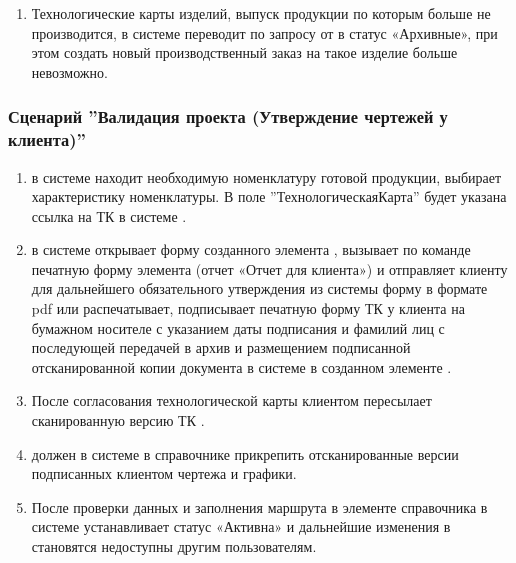 \begin{enumerate}
\item	Технологические карты изделий, выпуск продукции по которым больше не производится,  \tehnolog в системе \gofro переводит по запросу от \manager в статус «Архивные», при этом создать новый производственный заказ на такое изделие больше невозможно.

\end{enumerate}





\subsubsection{Сценарий ''Валидация проекта (Утверждение чертежей у клиента)''}
\label{bp:pm_2}

\begin{enumerate}
\item \manager в системе \erp находит необходимую номенклатуру готовой продукции, выбирает характеристику номенклатуры. В поле ''ТехнологическаяКарта'' будет указана ссылка на ТК в системе \gofro.
\item \manager  в системе  \gofro открывает форму созданного элемента , вызывает по команде  печатную форму элемента  (отчет «Отчет для клиента») и отправляет клиенту для дальнейшего обязательного утверждения из системы \gofro форму в формате pdf или распечатывает, подписывает печатную форму ТК у клиента на бумажном носителе с указанием даты подписания и фамилий лиц с последующей передачей в архив и размещением подписанной отсканированной копии документа в системе \gofro в созданном элементе .
 \item	После согласования технологической карты клиентом \manager  пересылает сканированную версию ТК  \tehnolog. 
 \item \tehnolog должен в системе \gofro в справочнике  прикрепить отсканированные версии подписанных клиентом чертежа и графики.
\item	После проверки данных и заполнения маршрута \tehnolog  
в элементе справочника
 в системе \gofro устанавливает статус «Активна» и дальнейшие изменения в  становятся недоступны другим пользователям.

\end{enumerate}




